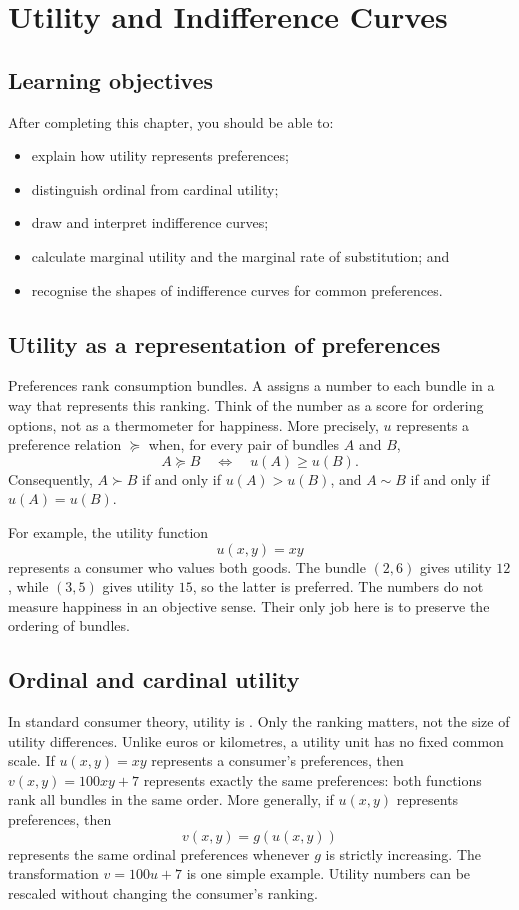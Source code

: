 \chapter{Utility and Indifference Curves}
\label{chap:utility}

\section{Learning objectives}

After completing this chapter, you should be able to:
\begin{itemize}
  \item explain how utility represents preferences;
  \item distinguish ordinal from cardinal utility;
  \item draw and interpret indifference curves;
  \item calculate marginal utility and the marginal rate of substitution; and
  \item recognise the shapes of indifference curves for common preferences.
\end{itemize}

\section{Utility as a representation of preferences}

Preferences rank consumption bundles. A  assigns a
number to each bundle in a way that represents this ranking. Think of the
number as a score for ordering options, not as a thermometer for happiness.
More precisely, $u$ represents a preference relation $\succeq$ when, for
every pair of bundles $A$ and $B$,
\[
A\succeq B
\quad\Longleftrightarrow\quad
u(A)\geq u(B).
\]
Consequently, $A\succ B$ if and only if $u(A)>u(B)$, and $A\sim B$ if and
only if $u(A)=u(B)$.

For example, the utility function
\[
u(x,y)=xy
\]
represents a consumer who values both goods. The bundle $(2,6)$ gives utility
$12$, while $(3,5)$ gives utility $15$, so the latter is preferred. The
numbers do not measure happiness in an objective sense. Their only job here
is to preserve the ordering of bundles.

\section{Ordinal and cardinal utility}

In standard consumer theory, utility is . Only the ranking
matters, not the size of utility differences. Unlike euros or kilometres, a
utility unit has no fixed common scale. If $u(x,y)=xy$ represents a
consumer's preferences, then $v(x,y)=100xy+7$ represents exactly the same
preferences: both functions rank all bundles in the same order. More
generally, if $u(x,y)$ represents preferences, then
\[
v(x,y)=g(u(x,y))
\]
represents the same ordinal preferences whenever $g$ is strictly increasing.
The transformation $v=100u+7$ is one simple example. Utility numbers can be
rescaled without changing the consumer's ranking.

